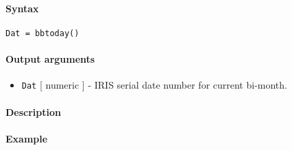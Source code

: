 


	\paragraph{Syntax}\label{syntax}

\begin{verbatim}
Dat = bbtoday()
\end{verbatim}

\paragraph{Output arguments}\label{output-arguments}

\begin{itemize}
\itemsep1pt\parskip0pt
\item
  \texttt{Dat} {[} numeric {]} - IRIS serial date number for current
  bi-month.
\end{itemize}

\paragraph{Description}\label{description}

\paragraph{Example}\label{example}


